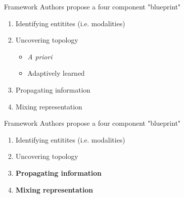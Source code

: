 \documentclass{beamer}
\begin{document}
\begin{frame}{Framework}
    Authors propose a four component "blueprint"
    \begin{enumerate}
    \item Identifying entitites (i.e. modalities)
    \item Uncovering topology 
    \begin{itemize}
        \item {\it A priori}
        \item Adaptively learned
    \end{itemize}
    \item Propagating information 
    \item Mixing representation 
    \end{enumerate}
\end{frame}


\begin{frame}{Framework}
    Authors propose a four component "blueprint"
    \begin{enumerate}
    \item Identifying entitites (i.e. modalities)
    \item Uncovering topology 
    \item {\bf Propagating information }
    \item {\bf Mixing representation }
    \end{enumerate}

\end{frame}
\end{document}
